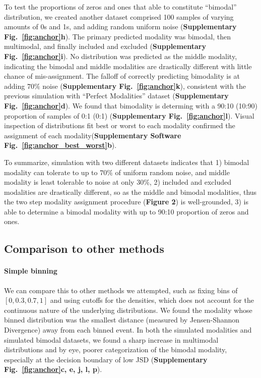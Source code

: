 To test the proportions of zeros and ones that able to constitute ``bimodal'' distribution, we created another dataset comprised 100 samples of varying amounts of 0s and 1s, and adding random uniform noise (\textbf{Supplementary Fig.~\ref{fig:anchor}h}). The primary predicted modality was bimodal, then multimodal, and finally included and excluded (\textbf{Supplementary Fig.~\ref{fig:anchor}i}). No distribution was predicted as the middle modality, indicating the bimodal and middle modalities are drastically different with little chance of mis-assignment. The falloff of correctly predicting bimodality is at adding $70\%$ noise (\textbf{Supplementary Fig.~\ref{fig:anchor}k}), consistent with the previous simulation with ``Perfect Modalities'' dataset (\textbf{Supplementary Fig.~\ref{fig:anchor}d}). We found that bimodality is determing with a 90:10 (10:90) proportion of samples of 0:1 (0:1) (\textbf{Supplementary Fig.~\ref{fig:anchor}l}). Visual inspection of distributions fit best or worst to each modality confirmed the assignment of each modality(\textbf{Supplementary Software Fig.~\ref{fig:anchor_best_worst}b}).

To summarize, simulation with two different datasets indicates that 1) bimodal modality can tolerate to up to $70\%$ of uniform random noise, and middle modality is least tolerable to noise at only $30\%$, 2) included and excluded modalities are drastically different, so as the middle and bimodal modalities, thus the two step modality assignment procedure (\textbf{Figure 2}) is well-grounded, 3) \anchor is able to determine a bimodal modality with up to 90:10 proportion of zeros and ones.

\subsection{Comparison to other methods}

\paragraph{Simple binning} 
We can compare this to other methods we attempted, such as fixing bins of $[0, 0.3, 0.7, 1]$ and using cutoffs for the densities, which does not account for the continuous nature of the underlying distributions. We found the modality whose binned distribution was the smallest distance (measured by Jensen-Shannon Divergence\cite{Anonymous:2011vn}) away from each binned event. In both the simulated modalities and simulated bimodal datasets, we found a sharp increase in multimodal distributions and by eye, poorer categorization of the bimodal modality, especially at the decision boundary of low JSD (\textbf{Supplementary Fig.~\ref{fig:anchor}c, e, j, l, p}).

